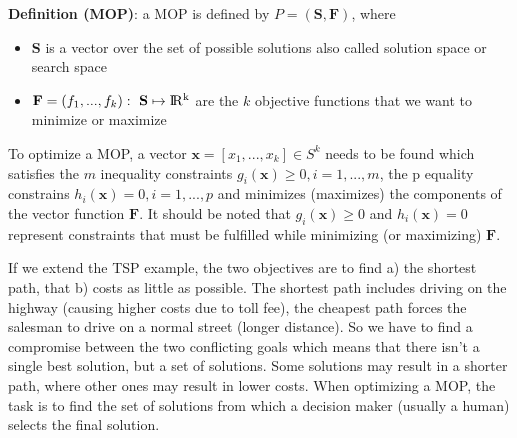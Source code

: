 \noindent\textbf{Definition (MOP)}: a MOP is defined by $P=(\mathbf{S},\mathbf{F})$, where
\begin{itemize}
  \item $\mathbf{S}$ is a vector over the set of possible solutions also called solution space or search space
  \item $\mathbf{F} = (f_1,...,f_k): \ \mathbf{S} \mapsto {\rm I\!R^k}$ are the $k$ objective functions that we want to minimize or maximize
\end{itemize}

To optimize a MOP, a vector $\mathbf{x} = [x_1,...,x_k] \in S^k$ needs to be found which satisfies the $m$ inequality constraints $g_i(\mathbf{x}) \ge 0, i=1,...,m$, the p equality constrains $h_i(\mathbf{x}) = 0, i=1,...,p$ and minimizes (maximizes) the components of the vector function $\mathbf{F}$. It should be noted that $g_i(\mathbf{x}) \ge 0$ and $h_i(\mathbf{x}) = 0$ represent constraints that must be fulfilled while minimizing (or maximizing) $\mathbf{F}$.


If we extend the TSP example, the two objectives are to find a) the shortest path, that b) costs as little as possible. The shortest path includes driving on the highway (causing higher costs due to toll fee), the cheapest path forces the salesman to drive on a normal street (longer distance). So we have to find a compromise between the two conflicting goals which means that there isn't a single best solution, but a set of solutions. Some solutions may result in a shorter path, where other ones may result in lower costs. When optimizing a MOP, the task is to find the set of solutions from which a decision maker (usually a human) selects the final solution.

